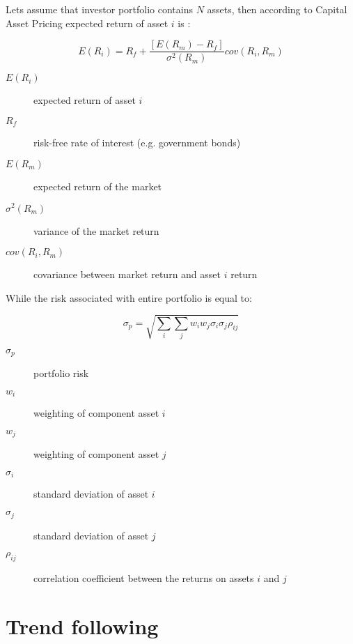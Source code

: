 Lets assume that investor portfolio contains $N$ assets, then according to Capital Asset Pricing expected return of asset $i$ is \cite{CAPM}: 

\begin{equation}
\label{first_eq}
 E(R_{i})  = R_{f} + \frac{ [E(R_{m}) - R_{f}]} {\sigma^2(R_{m})} cov(R_{i}, R_{m})
\end{equation} 

\begin{description}
  \item [$E(R_{i})$]
    expected return of asset $i$
  \item [$R_{f}$]
    risk-free rate of interest (e.g. government bonds)
  \item [$E(R_{m})$]
    expected return of the market
  \item [$\sigma^2(R_{m})$]
    variance of the market return
  \item [$cov(R_{i}, R_{m})$]
    covariance between market return and asset $i$ return
\end{description}

While the risk associated with entire portfolio is equal to:

\begin{equation}
\label{sec_eq}
 \sigma_{p}  = \sqrt{\sum_{i} \sum_{j} w_{i}w_{j} \sigma_{i} \sigma_{j} \rho_{ij}}
\end{equation} 

\begin{description}
  \item [$\sigma_{p}$]
    portfolio risk
  \item [$w_{i}$]
    weighting of component asset $i$
  \item [$w_{j}$]
    weighting of component asset $j$
  \item [$\sigma_{i}$]
    standard deviation of asset $i$
  \item [$\sigma_{j}$]
    standard deviation of asset $j$
  \item [$\rho_{ij}$]
    correlation coefficient between the returns on assets $i$ and $j$
\end{description}
 

\section{Trend following}
\label{sec:trendFollowing}

